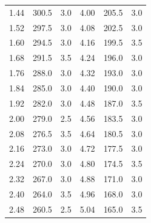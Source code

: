 \begin{table}
\begin{tabular}{S[table-format=1.2] S[table-format=3.1] S[table-format=1.1] S[table-format=1.2] S[table-format=3.1] S[table-format=1.1]}
        1.44 & 300.5 & 3.0 & 4.00 & 205.5 & 3.0 \\
        1.52 & 297.5 & 3.0 & 4.08 & 202.5 & 3.0 \\
        1.60 & 294.5 & 3.0 & 4.16 & 199.5 & 3.5 \\
        1.68 & 291.5 & 3.5 & 4.24 & 196.0 & 3.0 \\
        1.76 & 288.0 & 3.0 & 4.32 & 193.0 & 3.0 \\
        1.84 & 285.0 & 3.0 & 4.40 & 190.0 & 3.0 \\
        1.92 & 282.0 & 3.0 & 4.48 & 187.0 & 3.5 \\
        2.00 & 279.0 & 2.5 & 4.56 & 183.5 & 3.0 \\
        2.08 & 276.5 & 3.5 & 4.64 & 180.5 & 3.0 \\
        2.16 & 273.0 & 3.0 & 4.72 & 177.5 & 3.0 \\
        2.24 & 270.0 & 3.0 & 4.80 & 174.5 & 3.5 \\
        2.32 & 267.0 & 3.0 & 4.88 & 171.0 & 3.0 \\
        2.40 & 264.0 & 3.5 & 4.96 & 168.0 & 3.0 \\
        2.48 & 260.5 & 2.5 & 5.04 & 165.0 & 3.5 \\
        \bottomrule
    \end{tabular}
\end{table}
